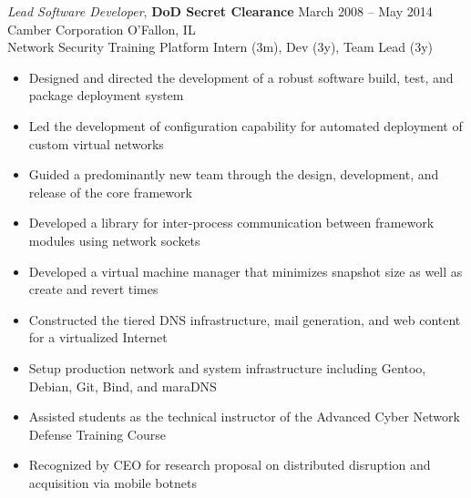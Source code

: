 \documentclass[margin,line]{resume}
\begin{document}
\begin{resume}
{\sl Lead Software Developer}, \textbf{\small DoD Secret Clearance}  \hfill  March 2008 -- May 2014\\
Camber Corporation                                                   \hfill  O'Fallon, IL\\
{\small Network Security Training Platform  \hfill  Intern (3m), Dev (3y), Team Lead (3y)}
\begin{itemize} \itemsep -2pt %
\small\item Designed and directed the development of a robust software build, test, and package deployment system
\small\item Led the development of configuration capability for automated deployment of custom virtual networks
\small\item Guided a predominantly new team through the design, development, and release of the core framework
\small\item Developed a library for inter-process communication between framework modules using network sockets
\small\item Developed a virtual machine manager that minimizes snapshot size as well as create and revert times
\small\item Constructed the tiered DNS infrastructure, mail generation, and web content for a virtualized Internet
\small\item Setup production network and system infrastructure including Gentoo, Debian, Git, Bind, and maraDNS
\small\item Assisted students as the technical instructor of the Advanced Cyber Network Defense Training Course
\small\item Recognized by CEO for research proposal on distributed disruption and acquisition via mobile botnets
\end{itemize}


\end{resume}
\end{document}
